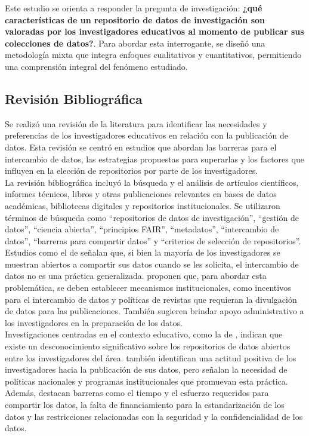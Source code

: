 \documentclass[runningheads]{llncs}
\begin{document}
Este estudio se orienta a responder la pregunta de investigación: \textbf{¿qué características de un repositorio de datos de investigación son valoradas por los investigadores educativos al momento de publicar sus colecciones de datos?}. Para abordar esta interrogante, se diseñó una metodología mixta que integra enfoques cualitativos y cuantitativos, permitiendo una comprensión integral del fenómeno estudiado.\\

\subsection{Revisión Bibliográfica}
Se realizó una revisión de la literatura para identificar las necesidades y preferencias de los investigadores educativos en relación con la publicación de datos. Esta revisión se centró en estudios que abordan las barreras para el intercambio de datos, las estrategias propuestas para superarlas y los factores que influyen en la elección de repositorios por parte de los investigadores.\\
La revisión bibliográfica incluyó la búsqueda y el análisis de artículos científicos, informes técnicos, libros y otras publicaciones relevantes en bases de datos académicas, bibliotecas digitales y repositorios institucionales. Se utilizaron términos de búsqueda como ``repositorios de datos de investigación'', ``gestión de datos'', ``ciencia abierta'', ``principios FAIR'', ``metadatos'', ``intercambio de datos'', ``barreras para compartir datos'' y ``criterios de selección de repositorios''.\\

Estudios como el de \cite{barczak2022} señalan que, si bien la mayoría de los investigadores se muestran abiertos a compartir sus datos cuando se les solicita, el intercambio de datos no es una práctica generalizada. \cite{barczak2022} proponen que, para abordar esta problemática, se deben establecer mecanismos institucionales, como incentivos para el intercambio de datos y políticas de revistas que requieran la divulgación de datos para las publicaciones. También sugieren brindar apoyo administrativo a los investigadores en la preparación de los datos.\\

Investigaciones centradas en el contexto educativo, como la de \cite{casali2022open}, indican que existe un desconocimiento significativo sobre los repositorios de datos abiertos entre los investigadores del área. \cite{casali2022open} también identifican una actitud positiva de los investigadores hacia la publicación de sus datos, pero señalan la necesidad de políticas nacionales y programas institucionales que promuevan esta práctica. Además, destacan barreras como el tiempo y el esfuerzo requeridos para compartir los datos, la falta de financiamiento para la estandarización de los datos y las restricciones relacionadas con la seguridad y la confidencialidad de los datos.\\
\end{document}
